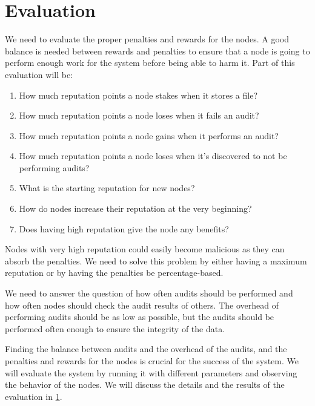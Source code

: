 \chapter{Evaluation}
\label{chapter:evaluation}

We need to evaluate the proper penalties and rewards for the nodes.
A good balance is needed between rewards and penalties to ensure that a node is
going to perform enough work for the system before being able to harm it.
Part of this evaluation will be:
\begin{enumerate}
    \item How much reputation points a node stakes when it stores a file?
    \item How much reputation points a node loses when it fails an audit?
    \item How much reputation points a node gains when it performs an audit?
    \item How much reputation points a node loses when it's discovered to not be performing audits?
    \item What is the starting reputation for new nodes?
    \item How do nodes increase their reputation at the very beginning?
    \item Does having high reputation give the node any benefits?
\end{enumerate}

Nodes with very high reputation could easily become malicious as they can absorb the penalties.
We need to solve this problem by either having a maximum reputation or by having the penalties be
percentage-based.

We need to answer the question of how often audits should be performed and how often nodes should
check the audit results of others.
The overhead of performing audits should be as low as possible, but the audits should be performed often enough
to ensure the integrity of the data.

Finding the balance between audits and the overhead of the audits, and the penalties and rewards for the nodes
is crucial for the success of the system.
We will evaluate the system by running it with different parameters and observing the behavior of the nodes.
We will discuss the details and the results of the evaluation in \ref{chapter:evaluation}.
